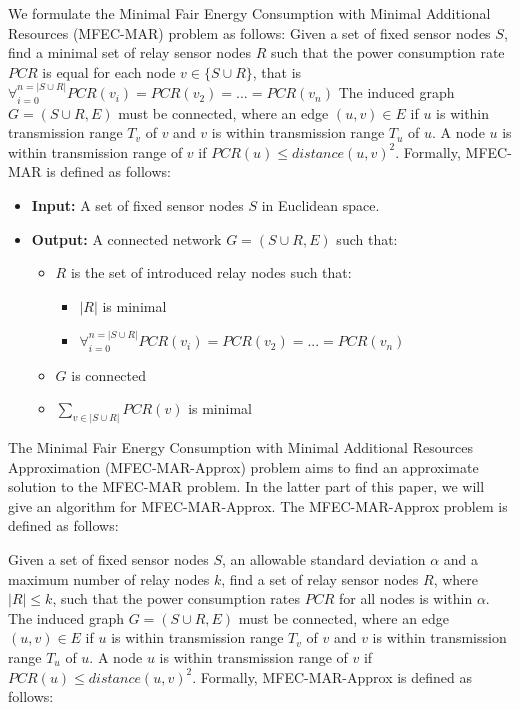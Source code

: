 We formulate the Minimal Fair Energy Consumption with Minimal Additional Resources (MFEC-MAR) problem as follows: Given a set of fixed sensor nodes $S$, find a minimal set of relay sensor nodes $R$ such that the power consumption rate $PCR$ is equal for each node $v \in \{S \cup R\}$, that is $\forall_{i=0}^{n=|S \cup R|} PCR(v_i) = PCR(v_2)=...=PCR(v_n)$ The induced graph $G=(S \cup R,E)$ must be connected, where an edge $(u,v) \in E$ if $u$ is within transmission range $T_v$ of $v$ and $v$ is within transmission range $T_u$ of $u$. A node $u$ is within transmission range of $v$ if  $PCR(u)\leq distance(u,v)^2$.
Formally, MFEC-MAR is defined as follows:
\begin{itemize}
 \item \textbf{Input:} A set of fixed sensor nodes $S$ in Euclidean space.
\item \textbf{Output:} A connected network $G = (S \cup R, E)$ such that:
	\begin{itemize}
		\item $R$ is the set of introduced relay nodes such that:
		\begin{itemize}
		\item $|R|$ is minimal
		\item $\forall_{i=0}^{n=|S \cup R|} PCR(v_i) = PCR(v_2)=...=PCR(v_n)$
		\end{itemize}
		\item $G$ is connected
		\item  $\sum_{v \in |S \cup R|} PCR(v)$ is minimal
	\end{itemize}
\end{itemize}

The Minimal Fair Energy Consumption with Minimal Additional Resources Approximation (MFEC-MAR-Approx) problem aims to find an approximate solution to the MFEC-MAR problem. In the latter part of this paper, we will give an algorithm for MFEC-MAR-Approx. The MFEC-MAR-Approx problem is defined as follows:

Given a set of fixed sensor nodes $S$, an allowable standard deviation $\alpha$ and a maximum number of relay nodes $k$, find a set of relay sensor nodes $R$, where $|R|\leq k$, such that the power consumption rates $PCR$ for all nodes is within $\alpha$. The induced graph $G=(S \cup R,E)$ must be connected, where an edge $(u,v) \in E$ if $u$ is within transmission range $T_v$ of $v$ and $v$ is within transmission range $T_u$ of $u$. A node $u$ is within transmission range of $v$ if  $PCR(u)\leq distance(u,v)^2$.
Formally, MFEC-MAR-Approx is defined as follows:


